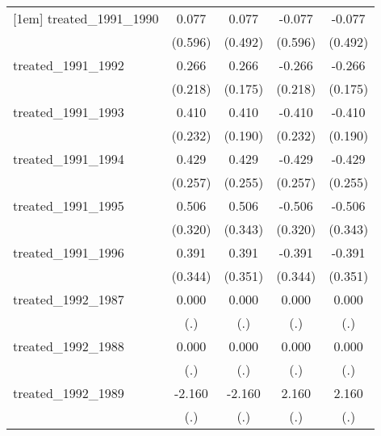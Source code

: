 {\begin{tabular}{l*{4}{c}}
[1em]
treated\_1991\_1990&       0.077         &       0.077         &      -0.077         &      -0.077         \\
            &     (0.596)         &     (0.492)         &     (0.596)         &     (0.492)         \\
[1em]
treated\_1991\_1992&       0.266         &       0.266         &      -0.266         &      -0.266         \\
            &     (0.218)         &     (0.175)         &     (0.218)         &     (0.175)         \\
[1em]
treated\_1991\_1993&       0.410         &       0.410\sym{*}  &      -0.410         &      -0.410\sym{*}  \\
            &     (0.232)         &     (0.190)         &     (0.232)         &     (0.190)         \\
[1em]
treated\_1991\_1994&       0.429         &       0.429         &      -0.429         &      -0.429         \\
            &     (0.257)         &     (0.255)         &     (0.257)         &     (0.255)         \\
[1em]
treated\_1991\_1995&       0.506         &       0.506         &      -0.506         &      -0.506         \\
            &     (0.320)         &     (0.343)         &     (0.320)         &     (0.343)         \\
[1em]
treated\_1991\_1996&       0.391         &       0.391         &      -0.391         &      -0.391         \\
            &     (0.344)         &     (0.351)         &     (0.344)         &     (0.351)         \\
[1em]
treated\_1992\_1987&       0.000         &       0.000         &       0.000         &       0.000         \\
            &         (.)         &         (.)         &         (.)         &         (.)         \\
[1em]
treated\_1992\_1988&       0.000         &       0.000         &       0.000         &       0.000         \\
            &         (.)         &         (.)         &         (.)         &         (.)         \\
[1em]
treated\_1992\_1989&      -2.160         &      -2.160         &       2.160         &       2.160         \\
            &         (.)         &         (.)         &         (.)         &         (.)         \\

\end{tabular}}

